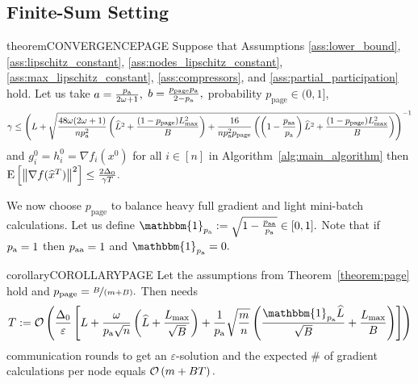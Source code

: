 \documentclass{article}
\makeatletter
\newcommand{\algorithmname}{DARIA}
\newcommand*{\probavailable}{\ensuremath{p_{\textnormal{a}}}}
\newcommand*{\probpairaa}{\ensuremath{p_{\textnormal{aa}}}}
\newcommand*{\probpage}{\ensuremath{p_{\text{page}}}}
\newcommand{\vast}{\bBigg@{4}}
\makeatother
\begin{document}
\subsection{Finite-Sum Setting}

\label{sec:finite_sum_setting}

\begin{restatable}{theorem}{CONVERGENCEPAGE}
  \label{theorem:page}
  Suppose that Assumptions \ref{ass:lower_bound}, \ref{ass:lipschitz_constant}, \ref{ass:nodes_lipschitz_constant}, \ref{ass:max_lipschitz_constant}, \ref{ass:compressors}, and \ref{ass:partial_participation} hold. Let us take $a = \frac{\probavailable}{2 \omega + 1} ,$ $b = \frac{\probpage \probavailable}{2 - \probavailable},$ probability $\probpage \in (0, 1]$,
  {\scriptsize $$\gamma \leq \left(L + \sqrt{\frac{48 \omega (2 \omega + 1)}{n \probavailable^2} \left(\widehat{L}^2 + \frac{(1 - \probpage)L_{\max}^2}{B}\right) + \frac{16}{n \probavailable^2 \probpage} \left(\left(1 - \frac{\probpairaa}{\probavailable}\right)\widehat{L}^2 + \frac{(1 - \probpage)L_{\max}^2}{B}\right)}\right)^{-1}$$}
  and $g^{0}_i = h^{0}_i = \nabla f_i(x^0)$ for all $i \in [n]$ in Algorithm~\ref{alg:main_algorithm} \algname{(\algorithmname-PAGE)}
  then ${\rm E}\left[\left\| \nabla f(\widehat{x}^T) \right\|^2\right] \leq \frac{2 \Delta_0}{\gamma T}.$
\end{restatable}

We now choose $\probpage$ to balance heavy full gradient and light mini-batch calculations. Let us define $\mathbbm{1}_{\probavailable} \eqdef \sqrt{1 - \frac{\probpairaa}{\probavailable}} \in [0, 1].$ Note that if $\probavailable = 1$ then $\probpairaa = 1$ and $\mathbbm{1}_{\probavailable} = 0.$
\begin{restatable}{corollary}{COROLLARYPAGE}
    \label{cor:mini_batch_oracle}
Let the assumptions from Theorem~\ref{theorem:page} hold and $\probpage = \nicefrac{B}{(m + B)}.$ 
Then \algname{\algorithmname-PAGE}
    needs 
    \begin{align}
      \label{eq:rate_dasha_pp_page}
      T \eqdef \cO\left(\frac{\Delta_0}{\varepsilon}\left[L + \frac{\omega}{\probavailable\sqrt{n}}\left(\widehat{L} + \frac{L_{\max}}{\sqrt{B}}\right) + \frac{1}{\probavailable}\sqrt{\frac{m}{n}}\left(\frac{\mathbbm{1}_{\probavailable}\widehat{L}}{\sqrt{B}} + \frac{L_{\max}}{B}\right)\right]\right)
    \end{align}
    communication rounds to get an $\varepsilon$-solution and the expected \# of gradient calculations per node equals $\mathcal{O}\left(m + B T\right).$
\end{restatable}
\end{document}
